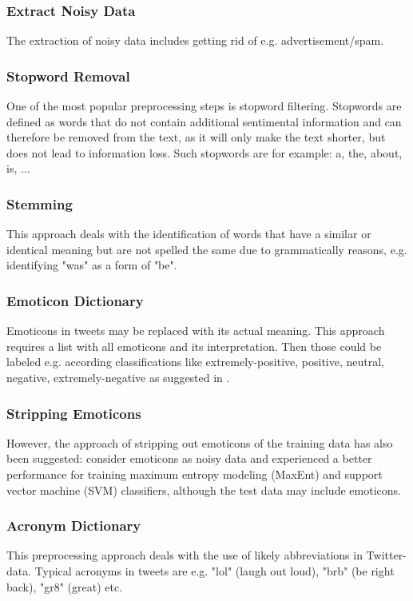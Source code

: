 \documentclass{acm_proc_article-sp}
\begin{document}
\subsubsection{Extract Noisy Data}
The extraction of noisy data includes getting rid of e.g. advertisement/spam.

\subsubsection{Stopword Removal}
One of the most popular preprocessing steps is stopword filtering. Stopwords are defined as words that do not contain additional sentimental information and can therefore be removed from the text, as it will only make the text shorter, but does not lead to information loss. Such stopwords are for example: a, the, about, is, ...

\subsubsection{Stemming}
This approach deals with the identification of words that have a similar or identical meaning but are not spelled the same due to grammatically reasons, e.g. identifying "was" as a form of "be".

\subsubsection{Emoticon Dictionary}
Emoticons in tweets may be replaced with its actual meaning. This approach requires a list with all emoticons and its interpretation. Then those could be labeled e.g. according classifications like extremely-positive, positive, neutral, negative, extremely-negative as suggested in \cite{agarwal2011sentiment}.

\subsubsection{Stripping Emoticons}
However, the approach of stripping out emoticons of the training data has also been suggested: \cite{go2009twitter} consider emoticons as noisy data and experienced a better performance for training maximum entropy modeling (MaxEnt) and support vector machine (SVM) classifiers, although the test data may include emoticons.

\subsubsection{Acronym Dictionary}
This preprocessing approach deals with the use of likely abbreviations in Twitter-data. 
Typical acronyms in tweets are e.g. "lol" (laugh out loud), "brb" (be right back), "gr8" (great) etc.
\end{document}
